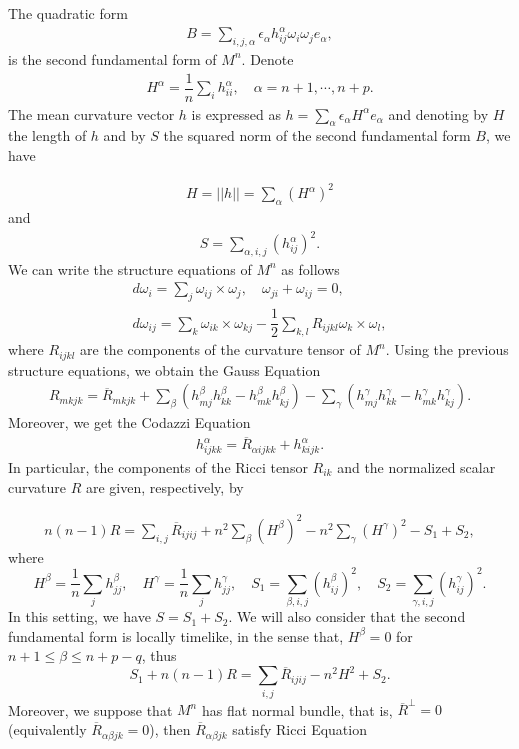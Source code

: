 \documentclass[leqno,11pt]{amsart}
\theoremstyle{plain}
\theoremstyle{definition}
\numberwithin{equation}{section}
\begin{document}
The quadratic form
\begin{eqnarray*}
B=\sum_{i,j,\alpha}\epsilon_{\alpha}h_{ij}^{\alpha}\omega_i\omega_je_{\alpha},
\end{eqnarray*}
is the second fundamental form of $M^n$. Denote 
\begin{eqnarray*}
H^{\alpha}=\dfrac{1}{n}\sum_{i}h_{ii}^{\alpha},\quad \alpha=n+1,\cdots,n+p.
\end{eqnarray*}
The mean curvature vector $h$ is expressed as $h=\sum_{\alpha}\epsilon_{\alpha}H^{\alpha}e_{\alpha}$ and denoting by $H$ the length of $h$ and by $S$ the squared norm of the second fundamental form $B$, we have

\begin{eqnarray*}
H=||h||=\sum_{\alpha}(H^{\alpha})^2
\end{eqnarray*}
and
\begin{eqnarray*}
S=\sum_{\alpha,i,j}(h_{ij}^{\alpha})^2.
\end{eqnarray*}
We can write the structure equations of $M^{n}$ as follows
\begin{eqnarray*}
d\omega_i=\sum_{j}\omega_{ij}\times \omega_j,\quad \omega_{ji}+\omega_{ij}=0,\\
d\omega_{ij}=\sum_{k}\omega_{ik}\times \omega_{kj}-\dfrac{1}{2}\sum_{k,l}R_{ijkl}\omega_k\times \omega_l,
\end{eqnarray*}
where $R_{ijkl}$ are the components of the curvature tensor of $M^n.$ Using the previous structure
equations, we obtain the Gauss Equation
\begin{eqnarray}\label{EQUACAO DE GAUSS}
R_{mkjk}=\overline{R}_{mkjk}+\sum_{\beta}(h_{mj}^{\beta}h_{kk}^{\beta}-h_{mk}^{\beta}h_{kj}^{\beta})-\sum_{\gamma}(h_{mj}^{\gamma}h_{kk}^{\gamma}-h_{mk}^{\gamma}h_{kj}^{\gamma}).
\end{eqnarray}
Moreover, we get the Codazzi Equation
\begin{eqnarray}\label{EQUACAO DE CODAZZI}
h_{ijkk}^{\alpha}=\overline{R}_{\alpha ijkk}+h_{kijk}^{\alpha}.
\end{eqnarray}
In particular, the components of the Ricci tensor $R_{ik}$ and the normalized scalar curvature $R$
are given, respectively, by

\begin{eqnarray}
n(n-1)R=\sum_{i,j}\overline{R}_{ijij}+n^2\sum_{\beta}(H^{\beta})^2-n^2\sum_{\gamma}(H^{\gamma})^2-S_1+S_2,
\end{eqnarray}
where 
$$H^{\beta}=\dfrac{1}{n}\sum_{j}h_{jj}^{\beta},\quad H^{\gamma}=\dfrac{1}{n}\sum_{j}h_{jj}^{\gamma},\quad S_{1}=\sum_{\beta,i,j}(h_{ij}^{\beta})^2, \quad S_2=\sum_{\gamma,i,j}(h_{ij}^{\gamma})^2.$$
In this setting, we have $S = S_1+S_2.$ We will also consider that the second fundamental form is locally timelike, in the sense that, $H^\beta=0$ for $n+1\leq \beta \leq n+p-q$, thus
\begin{equation}\label{equacaoRS}
S_1 + n(n-1)R = \sum_{i,j} \overline{R}_{ijij} - n^2H^2 + S_2.
\end{equation}
Moreover, we suppose that $M^n$ has flat normal bundle, that is, $\overline{R}^{\perp}=0$ (equivalently $\overline{R}_{\alpha \beta jk}=0$), then $\overline{R}_{\alpha \beta jk}$ satisfy Ricci Equation
\end{document}
